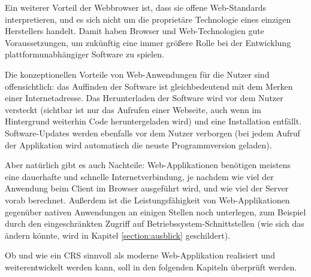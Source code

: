 Ein weiterer Vorteil der Webbrowser ist, dass sie offene Web-Standards interpretieren, und es sich nicht um die proprietäre Technologie eines einzigen Herstellers handelt. Damit haben Browser und Web-Technologien gute Voraussetzungen, um zukünftig eine immer größere Rolle bei der Entwicklung plattformunabhängiger Software zu spielen.

Die konzeptionellen Vorteile von Web-Anwendungen für die Nutzer sind offensichtlich: das Auffinden der Software ist gleichbedeutend mit dem Merken einer Internetadresse. Das Herunterladen der Software wird vor dem Nutzer versteckt (sichtbar ist nur das Aufrufen einer Webseite, auch wenn im Hintergrund weiterhin Code heruntergeladen wird) und eine Installation entfällt. Software-Updates werden ebenfalls vor dem Nutzer verborgen (bei jedem Aufruf der Applikation wird automatisch die neuste Programmversion geladen).

Aber natürlich gibt es auch Nachteile: Web-Applikationen benötigen meistens eine dauerhafte und schnelle Internetverbindung, je nachdem wie viel der Anwendung beim Client im Browser ausgeführt wird, und wie viel der Server vorab berechnet. Außerdem ist die Leistungsfähigkeit von Web-Applikationen gegenüber nativen Anwendungen an einigen Stellen noch unterlegen, zum Beispiel durch den eingeschränkten Zugriff auf Betriebssystem-Schnittstellen (wie sich das ändern könnte, wird in Kapitel \ref{section:ausblick} geschildert).

Ob und wie ein CRS sinnvoll als moderne Web-Applikation realisiert und weiterentwickelt werden kann, soll in den folgenden Kapiteln überprüft werden.

